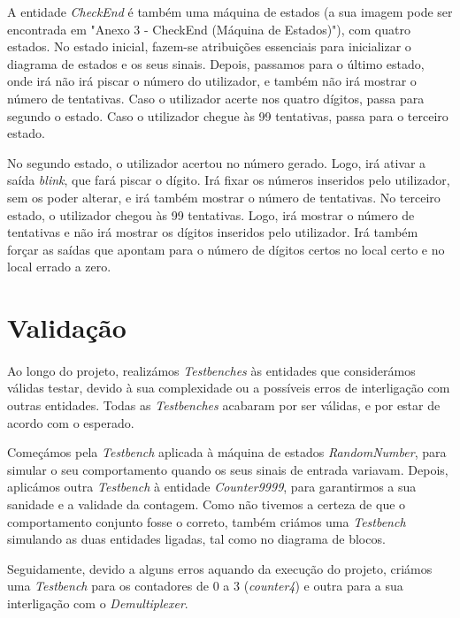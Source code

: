 \documentclass[11pt,openany,twoside]{report}
\begin{document}
A entidade \textit{CheckEnd} é também uma máquina de estados (a sua imagem pode ser encontrada em "Anexo 3 - CheckEnd (Máquina de Estados)"), com quatro estados. No estado inicial, fazem-se atribuições essenciais para inicializar o diagrama de estados e os seus sinais. Depois, passamos para o último estado, onde irá não irá piscar o número do utilizador, e também não irá mostrar o número de tentativas. Caso o utilizador acerte nos quatro dígitos, passa para segundo o estado. Caso o utilizador chegue às 99 tentativas, passa para o terceiro estado.

No segundo estado, o utilizador acertou no número gerado. Logo, irá ativar a saída \textit{blink}, que fará piscar o dígito. Irá fixar os números inseridos pelo utilizador, sem os poder alterar, e irá também mostrar o número de tentativas. No terceiro estado, o utilizador chegou às 99 tentativas. Logo, irá mostrar o número de tentativas e não irá mostrar os dígitos inseridos pelo utilizador. Irá também forçar as saídas que apontam para o número de dígitos certos no local certo e no local errado a zero.

\section{Validação}

\paragraph{ } Ao longo do projeto, realizámos \textit{Testbenches} às entidades que considerámos válidas testar, devido à sua complexidade ou a possíveis erros de interligação com outras entidades. Todas as \textit{Testbenches} acabaram por ser válidas, e por estar de acordo com o esperado.

Começámos pela \textit{Testbench} aplicada à máquina de estados \textit{RandomNumber}, para simular o seu comportamento quando os seus sinais de entrada variavam. Depois, aplicámos outra \textit{Testbench} à entidade \textit{Counter9999}, para garantirmos a sua sanidade e a validade da contagem. Como não tivemos a certeza de que o comportamento conjunto fosse o correto, também criámos uma \textit{Testbench} simulando as duas entidades ligadas, tal como no diagrama de blocos.

Seguidamente, devido a alguns erros aquando da execução do projeto, criámos uma \textit{Testbench} para os contadores de 0 a 3 (\textit{counter4}) e outra para a sua interligação com o \textit{Demultiplexer}.
\end{document}
